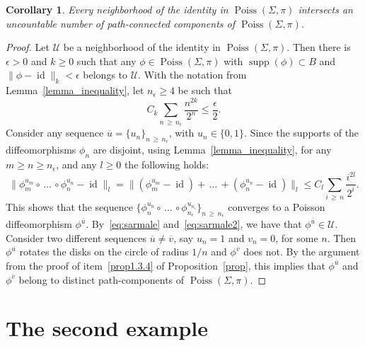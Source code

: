 \documentclass[10pt]{amsart}
\newtheorem{coro}[cdrthm]{Corollary}
\theoremstyle{definition}
\newcommand{\norm}[1]{\|#1\|}
\newcommand{\clU}{\mathcal{U}}
\DeclareMathOperator{\Poiss}{Poiss}
\DeclareMathOperator{\id}{id}
\DeclareMathOperator{\supp}{supp}
\begin{document}
\begin{coro}\label{coro}
Every neighborhood of the identity in $\Poiss(\Sigma,\pi)$ intersects an uncountable number of path-connected components of $\Poiss(\Sigma,\pi)$.
\end{coro}



\begin{proof}
Let $\clU$ be a neighborhood of the identity in $\Poiss(\Sigma,\pi)$. Then there is $\epsilon>0$ and $k\geq 0$ such that any $\phi\in \Poiss(\Sigma,\pi)$ with $\supp(\phi)\subset B$ and $\norm{\phi-\id}_k<\epsilon$ belongs to $\clU$. With the notation from Lemma~\ref{lemma_inequality}, let $n_{\epsilon}\geq 4$ be such that
\begin{equation}\label{eq:sarmale}
C_k\sum_{n\,\geq\,n_{\epsilon}}\frac{n^{2k}}{2^n}\leq \frac{\epsilon}{2}.
\end{equation}
Consider any sequence $\overline{u}=\{u_n\}_{n\,\geq\,n_{\epsilon}}$, with $u_n\in \{0,1\}$. Since the supports of the diffeomorphisms $\phi_n$ are disjoint, using Lemma~\ref{lemma_inequality}, for any $m\geq n\geq n_{\epsilon}$, and any $l\geq 0$ the following holds:
\begin{equation}\label{eq:sarmale2}
\norm{\phi^{u_{m}}_{m}\circ\,\ldots\,\circ
\phi^{u_{n}}_{n}-\id }_l=\norm{\left(\phi^{u_{m}}_{m}-\id\right)+\,\ldots\,+\left(\phi^{u_{n}}_{n}-\id\right)}_l\leq C_l\sum_{i\,\geq\,n}\frac{i^{2l}}{2^i}.
\end{equation}
This shows that the sequence $\{\phi^{u_{n}}_{n}\circ\,\ldots\,\circ\phi^{u_{n_{\epsilon}}}_{n_{\epsilon}}\}_{n\,\geq \,n_{\epsilon}}$ converges to a Poisson diffeomorphism $\phi^{\overline{u}}$. By~\eqref{eq:sarmale} and~\eqref{eq:sarmale2}, we have that $\phi^{\overline{u}}\in \clU$. Consider two different sequences $\overline{u}\neq \overline{v}$, say $u_n=1$ and $v_n=0$, for some $n$. Then $\phi^{\overline{u}}$ rotates the disks on the circle of radius $1/n$ and $\phi^{\overline{v}}$ does not. By the argument from the proof of item~\eqref{prop1.3.4} of Proposition~\ref{prop}, this implies that $\phi^{\overline{u}}$ and $\phi^{\overline{v}}$ belong to distinct path-components of $\Poiss(\Sigma,\pi)$.
\end{proof}


\section{The second example}
\end{document}
